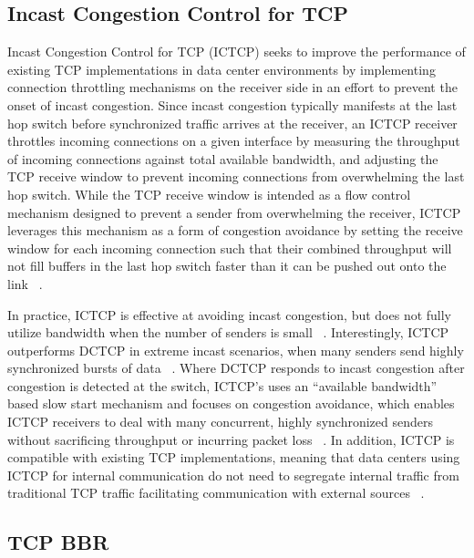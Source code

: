 \subsection{Incast Congestion Control for TCP}

Incast Congestion Control for TCP (ICTCP) seeks to improve the performance of existing TCP implementations in data center environments by implementing connection throttling mechanisms on the receiver side in an effort to prevent the onset of incast congestion. Since incast congestion typically manifests at the last hop switch before synchronized traffic arrives at the receiver, an ICTCP receiver throttles incoming connections on a given interface by measuring the throughput of incoming connections against total available bandwidth, and adjusting the TCP receive window to prevent incoming connections from overwhelming the last hop switch. While the TCP receive window is intended as a flow control mechanism designed to prevent a sender from overwhelming the receiver, ICTCP leverages this mechanism as a form of congestion avoidance by setting the receive window for each incoming connection such that their combined throughput will not fill buffers in the last hop switch faster than it can be pushed out onto the link ~\cite{wu_ictcp:_2013}. 

In practice, ICTCP is effective at avoiding incast congestion, but does not fully utilize bandwidth when the number of senders is small ~\cite{wu_ictcp:_2013}. Interestingly, ICTCP outperforms DCTCP in extreme incast scenarios, when many senders send highly synchronized bursts of data ~\cite{wu_ictcp:_2013, alizadeh_data_2010}. Where DCTCP responds to incast congestion after congestion is detected at the switch, ICTCP's uses an ``available bandwidth'' based slow start mechanism and focuses on congestion avoidance, which enables ICTCP receivers to deal with many concurrent, highly synchronized senders without sacrificing throughput or incurring packet loss ~\cite{alizadeh_data_2010, wu_ictcp:_2013}. In addition, ICTCP is compatible with existing TCP implementations, meaning that data centers using ICTCP for internal communication do not need to segregate internal traffic from traditional TCP traffic facilitating communication with external sources ~\cite{wu_ictcp:_2013}.

\subsection{TCP BBR}

